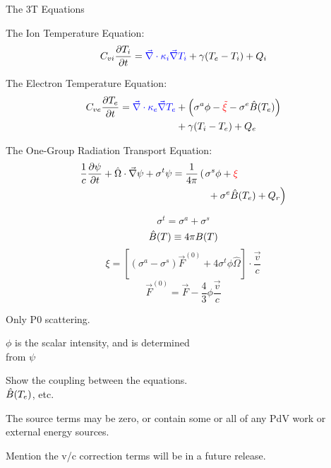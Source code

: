 \documentclass{myslidehead}
\begin{document}
\begin{slide}

  \begin{center}
    \large The 3T Equations
  \end{center}

  The Ion Temperature Equation:
  \[
    C_{vi} \frac{\partial{T_{i}}}{\partial{t}} = \textcolor{blue}{\vec{\nabla} \cdot \kappa_{i} \vec{\nabla} T_{i}}
    + \gamma (T_{e}-T_{i}) + Q_{i}
  \]

  The Electron Temperature Equation:
  \[
    \begin{split}
        C_{ve} \frac{\partial{T_{e}}}{\partial{t}} = 
                \textcolor{blue}{\vec{\nabla} \cdot \kappa_{e} \vec{\nabla} T_{e}} & +
                     \left(
                        \sigma^{a} \phi - \textcolor{red}{\tilde{\xi}}
                        - \sigma^{e} \hat{B}(T_{e}) \right) \\
                        & + \gamma (T_{i} - T_{e}) + Q_{e}
    \end{split}
  \]

  The One-Group Radiation Transport Equation:
  \[
    \begin{split}
        \frac{1}{c} \partl{\psi}{t}
        + \hat{\Omega} \cdot \del \psi
        + \sigma^{t} \psi
        = \frac{1}{4 \pi}
         \left( \rule{0mm}{.8em} \right. & \sigma^{s} \phi 
                + \futurecolor{\xi} \\
                & \left. \mbox{} + \sigma^{e} \B(T_{e})
                + Q_{r}
         \right)
    \end{split}
  \]

\end{slide}


\begin{note}
  \[
        \sigma^{t} = \sigma^{a} + \sigma^{s}
  \]
  \[
        \hat{B}(T) \equiv 4\pi B(T)
  \]
  \[
        \xi = \left[ (\sigma^{a} - \sigma^{s}) \vec{F}^{(0)}
                + 4 \sigma^{t} \phi \hat{\Omega} \right]
                        \cdot \frac{\vec{v}}{c}
  \]
  \[
        \vec{F}^{(0)} = \vec{F} - \frac{4}{3} \phi
                                                \frac{\vec{v}}{c}
  \]

\end{note}


\begin{note}

  Only P0 scattering.

  $\phi$ is the scalar intensity, and is determined \\
  from $\psi$

  Show the coupling between the equations. \\
  $\hat{B}(T_{e})$, etc.

  The source terms may be zero, or contain some or all of any
  PdV work or external energy sources.

  Mention the v/c correction terms will be in a future release.

\end{note}
\end{document}
